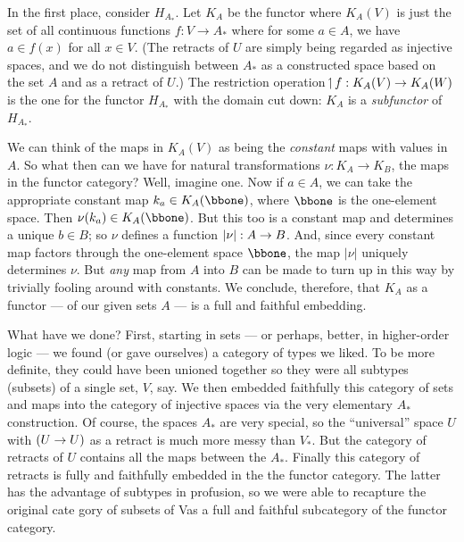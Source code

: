In the first place, consider $H_{A_*}$. Let $K_A$ be the functor where $K_A(V)$ is just
the set of all continuous functions $f: V\to A_*$ where for some $a \in A$, we have $a \in
f(x)$ for all $x \in V$. (The retracts of $U$ are simply being regarded as injective
spaces, and we do not distinguish between $A_*$ as a constructed space based on the set
$A$ and as a retract of $U$.) The restriction operation $\!\upharpoonleft\! f : K_A(V)\rightarrow K_A(W)$ is the
one for the functor $H_{A_*}$ with the domain cut down: $K_A$ is a {\it subfunctor} of
$H_{A_*}$.

We can think of the maps in $K_A(V)$ as being the {\it constant} maps with values in $A$.
So what then can we have for natural transformations $\nu: K_A \to K_B$, the maps in the
functor category? Well, imagine one. Now if $a \in A$, we can take the appropriate
constant map $k_a \in K_A(\bbone)$, where $\bbone$ is the one-element space. Then
$\nu(k_a) \in K_A(\bbone)$. But this too is a constant map and determines a unique $b \in
B$; so $\nu$ defines a function $|\nu| : A \rightarrow B$. And, since every constant map factors
through the one-element space $\bbone$, the map $|\nu|$ uniquely determines $\nu$. But
{\it any} map from $A$ into $B$ can be made to turn up in this way by trivially fooling
around with constants. We conclude, therefore, that $K_A$ as a functor --- of our given
sets $A$ --- is a full and faithful embedding.

What have we done? First, starting in sets --- or perhaps, better, in higher-order logic
--- we found (or gave ourselves) a category of types we liked. To be more definite, they
could have been unioned together so they were all subtypes (subsets) of a single set, $V$,
say. We then embedded faithfully this category of sets and maps into the category of
injective spaces via the very elementary $A_*$ construction. Of course, the spaces $A_*$
are very special, so the ``universal'' space $U$ with $(U\rightarrow U)$ as a retract is much more
messy than $V_*$. But the category of retracts of $U$ contains all the maps between the
$A_*$. Finally this category of retracts is fully and faithfully embedded in the the
functor category. The latter has the advantage of subtypes in profusion, so we were able
to recapture the original cate gory of subsets of Vas a full and faithful subcategory of
the functor category.

